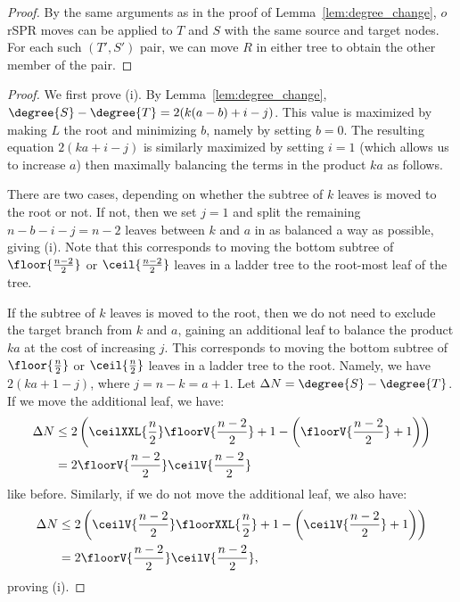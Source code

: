 \documentclass[10pt,twoside,leqno,twocolumn]{article}
\begin{document}
\pairedneighbors*
\begin{proof}
By the same arguments as in the proof of Lemma~\ref{lem:degree_change}, $o$ rSPR moves can be applied to $T$ and $S$ with the same source and target nodes.
For each such $(T',S')$ pair, we can move $R$ in either tree to obtain the other member of the pair.
\end{proof}

\degreemaxdeltaadjacent*
\begin{proof}
	We first prove (i).
	By Lemma~\ref{lem:degree_change}, $\degree{S} - \degree{T} = 2(k(a-b) + i - j)$.
	This value is maximized by making $L$ the root and minimizing $b$, namely by setting $b=0$.
	The resulting equation $2(ka + i - j)$ is similarly maximized by setting $i=1$ (which allows us to increase $a$) then maximally balancing the terms in the product $ka$ as follows.

	There are two cases, depending on whether the subtree of $k$ leaves is moved to the root or not.
    If not, then we set $j=1$ and split the remaining $n-b-i-j = n-2$ leaves between $k$ and $a$ in as balanced a way as possible, giving (i).
	Note that this corresponds to moving the bottom subtree of $\floor{\frac{n-2}{2}}$ or $\ceil{\frac{n-2}{2}}$ leaves in a ladder tree to the root-most leaf of the tree.

	If the subtree of $k$ leaves is moved to the root, then we do not need to exclude the target branch from $k$ and $a$, gaining an additional leaf to balance the product $ka$ at the cost of increasing $j$.
	This corresponds to moving the bottom subtree of $\floor{\frac{n}{2}}$ or $\ceil{\frac{n}{2}}$ leaves in a ladder tree to the root.
	Namely, we have $2(ka + 1 - j)$, where $j = n - k = a + 1$.
	Let ${\Delta}N = \degree{S} - \degree{T}$.
	If we move the additional leaf, we have:
	\begin{align*}
		{\Delta}N &\le 2\left(\ceilXXL{\frac{n}{2}}\floorV{\frac{n-2}{2}}  + 1 - \left(\floorV{\frac{n-2}{2}} + 1\right)\right) \\
		&= 2\floorV{\frac{n-2}{2}}\ceilV{\frac{n-2}{2}}
	\end{align*}
like before.
Similarly, if we do not move the additional leaf, we also have:
\begin{align*}
	{\Delta}N &\le 2 \left(\ceilV{\frac{n-2}{2}}\floorXXL{\frac{n}{2}} +1 -  \left(\ceilV{\frac{n-2}{2}} + 1\right)\right) \\
&= 2\floorV{\frac{n-2}{2}}\ceilV{\frac{n-2}{2}},
\end{align*}
proving (i).


\end{proof}
\end{document}
